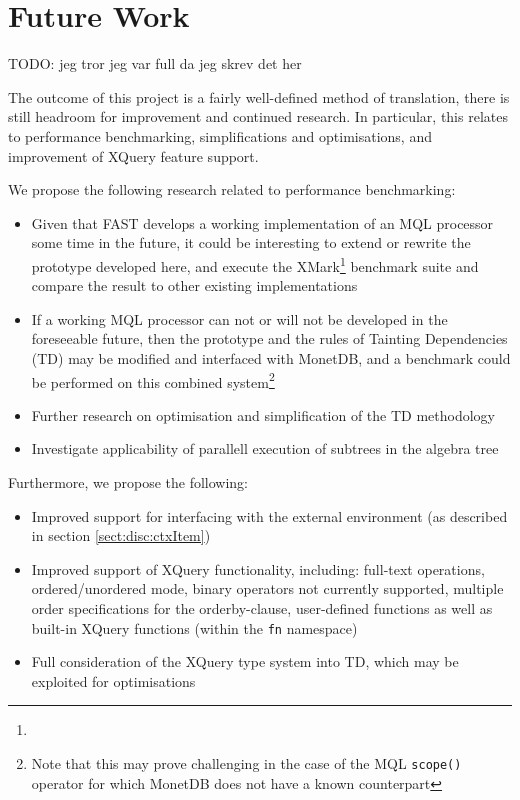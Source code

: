 \chapter{Future Work}
\label{chapter:future}

TODO: jeg tror jeg var full da jeg skrev det her

The outcome of this project is a fairly well-defined method of translation,
there is still headroom for improvement and continued research. In particular,
this relates to performance benchmarking, simplifications and optimisations,
and improvement of XQuery feature support.

We propose the following research related to performance benchmarking:
\begin{itemize}
  \item Given that FAST develops a working implementation of an MQL processor
  some time in the future, it could be interesting to extend or rewrite the
  prototype developed here, and execute the
  XMark\footnote{} 
  benchmark suite and compare the result to other existing implementations
  \item If a working MQL processor can not or will not be developed in the
  foreseeable future, then the prototype and the rules of Tainting
  Dependencies (TD) may be modified and interfaced with MonetDB, and a
  benchmark could be performed on this combined system\footnote{Note that this may prove challenging in the case of
  the MQL \texttt{scope()} operator for which MonetDB does not have a known
  counterpart}
  \item Further research on optimisation and simplification of the TD
  methodology
  \item Investigate applicability of parallell execution of subtrees in the
  algebra tree
\end{itemize}

Furthermore, we propose the following:
\begin{itemize}
  \item Improved support for interfacing with the external environment (as
  described in section \ref{sect:disc:ctxItem})
  \item Improved support of XQuery functionality, including: full-text
  operations, ordered/unordered mode, binary operators not currently supported,
  multiple order specifications for the orderby-clause, user-defined functions
  as well as built-in XQuery functions (within the \texttt{fn} namespace)
  \item Full consideration of the XQuery type system into TD, which may be
  exploited for optimisations
\end{itemize}
